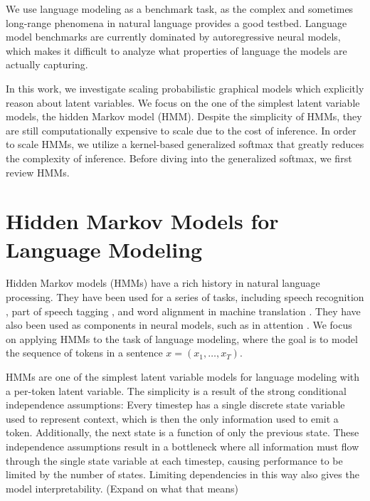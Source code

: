 \documentclass{article}
\begin{document}
We use language modeling as a benchmark task, as the complex 
and sometimes long-range phenomena in natural language provides a good testbed.
Language model benchmarks are currently dominated by autoregressive neural models,
which makes it difficult to analyze what properties of language the models are
actually capturing.

In this work, we investigate scaling probabilistic graphical models
which explicitly reason about latent variables.
We focus on the one of the simplest latent variable models,
the hidden Markov model (HMM).
Despite the simplicity of HMMs,
they are still computationally expensive to scale
due to the cost of inference.
In order to scale HMMs, we utilize a kernel-based generalized softmax that greatly
reduces the complexity of inference.
Before diving into the generalized softmax, we first review HMMs.



\section{Hidden Markov Models for Language Modeling}
Hidden Markov models (HMMs) have a rich history in natural language processing.
They have been used for a series of tasks, including
speech recognition \citep{rabiner1990tut},
part of speech tagging \citep{merialdo1994tagging}, 
and word alignment in machine translation \citep{vogel1996hmm}.
They have also been used as components in neural models,
such as in attention \citep{shankar2018posterior}.
We focus on applying HMMs to the task of language modeling,
where the goal is to model the sequence of tokens in a sentence $x = (x_1,\ldots,x_T)$.

HMMs are one of the simplest latent variable models for language modeling
with a per-token latent variable.
The simplicity is a result of the strong conditional independence assumptions:
Every timestep has a single discrete state variable used to represent context,
which is then the only information used to emit a token.
Additionally, the next state is a function of only the previous state.
These independence assumptions result in a bottleneck where all information
must flow through the single state variable at each timestep,
causing performance to be limited by the number of states.
Limiting dependencies in this way also gives the model interpretability.
(Expand on what that means)
\end{document}
